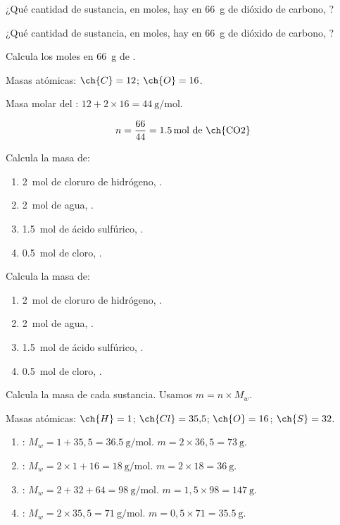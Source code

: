 \begin{exercise}
    ¿Qué cantidad de sustancia, en moles, hay en \qty{66}{\g} de dióxido de carbono, ?
    \begin{solu}
        ¿Qué cantidad de sustancia, en moles, hay en \qty{66}{\g} de dióxido de carbono, ?

        Calcula los moles en \qty{66}{\g} de .

        Masas atómicas: \( \ch{C} = 12 \); \( \ch{O} = 16 \).

        Masa molar del : \( 12 + 2 \times 16 = \qty{44}{\g\per\mole} \).

        \begin{equation*}
            n = \dfrac{66}{44} = \qty{1.5}{\mole} \text{ de \ch{CO2}}
        \end{equation*}
    \end{solu}
\end{exercise}

\begin{exercise}
    Calcula la masa de:
    \begin{enumerate}[label=\letraminuscula]
\item \qty{2}{\mole} de cloruro de hidrógeno, .
\item \qty{2}{\mole} de agua, .
\item \qty{1.5}{\mole} de ácido sulfúrico, .
\item \qty{0.5}{\mole} de cloro, .
    \end{enumerate}
    \begin{solu}
        Calcula la masa de:
        \begin{enumerate}[label=\letraminuscula]
\item \qty{2}{\mole} de cloruro de hidrógeno, .
\item \qty{2}{\mole} de agua, .
\item \qty{1.5}{\mole} de ácido sulfúrico, .
\item \qty{0.5}{\mole} de cloro, .
        \end{enumerate}

        Calcula la masa de cada sustancia. Usamos \( m = n \times M_w \).

        Masas atómicas: \( \ch{H} = 1 \); \( \ch{Cl} = 35{,}5 \); \( \ch{O} = 16 \); \( \ch{S} = 32 \).

        \begin{enumerate}[label=\letraminuscula]
\item {}: \( M_w = 1 + 35{,}5 = \qty{36.5}{\g\per\mole} \). \( m = 2 \times 36{,}5 = \qty{73}{\g} \).
\item {}: \( M_w = 2 \times 1 + 16 = \qty{18}{\g\per\mole} \). \( m = 2 \times 18 = \qty{36}{\g} \).
\item {}: \( M_w = 2 + 32 + 64 = \qty{98}{\g\per\mole} \). \( m = 1{,}5 \times 98 = \qty{147}{\g} \).
\item {}: \( M_w = 2 \times 35{,}5 = \qty{71}{\g\per\mole} \). \( m = 0{,}5 \times 71 = \qty{35.5}{\g} \).
        \end{enumerate}
    \end{solu}
\end{exercise}

